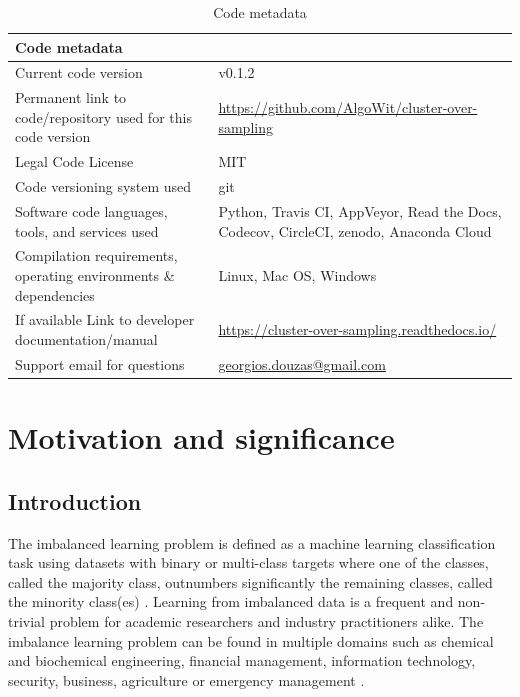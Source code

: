 \documentclass[preprint,12pt, a4paper]{elsarticle}
\begin{document}
\begin{table}[H]
\begin{tabular}{|p{6.5cm}|p{6.5cm}|}
\hline
Code metadata & \\
\hline
Current code version & v0.1.2 \\
\hline
Permanent link to code/repository used for this code version & \url{https://github.com/AlgoWit/cluster-over-sampling} \\
\hline
Legal Code License & MIT \\
\hline
Code versioning system used & git \\
\hline
Software code languages, tools, and services used & Python, Travis CI, AppVeyor, Read the Docs, Codecov, CircleCI, zenodo, Anaconda Cloud \\
\hline
Compilation requirements, operating environments \& dependencies & Linux, Mac OS, Windows \\
\hline
If available Link to developer documentation/manual & \url{https://cluster-over-sampling.readthedocs.io/} \\
\hline
Support email for questions & \href{mailto:georgios.douzas@gmail.com}{georgios.douzas@gmail.com} \\
\hline
\end{tabular}
\caption{Code metadata}
\label{} 
\end{table}

\linenumbers


\section{Motivation and significance}
\label{motivation}

\subsection{Introduction}
\label{introduction}

The imbalanced learning problem is defined as a machine learning classification task using datasets with binary or multi-class targets where one of the classes, called the majority class, outnumbers significantly the remaining classes, called the minority class(es) \cite{Chawla2003}. Learning from imbalanced data is a frequent and non-trivial problem for academic researchers and industry practitioners alike. The imbalance learning problem can be found in multiple domains such as chemical and biochemical engineering, financial management, information technology, security, business, agriculture or emergency management \cite{Haixiang2017}.
\end{document}
